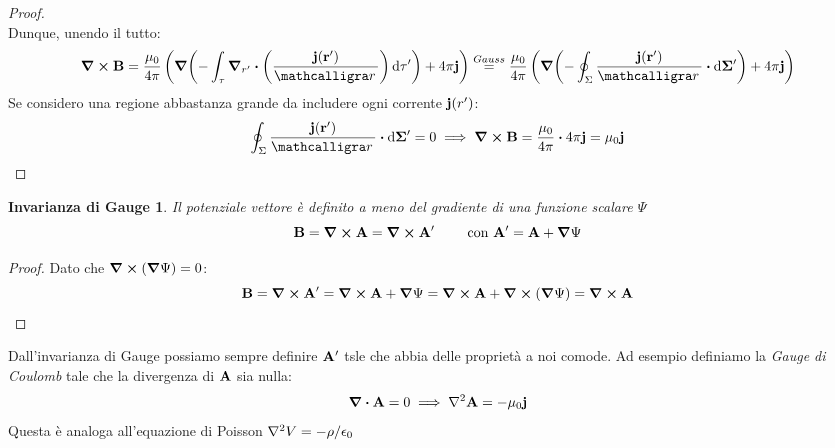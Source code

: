 \documentclass[12pt,a4paper]{article}
\begin{document}
\begin{proof}
\begin{equation*}
    \end{equation*}
    Dunque, unendo il tutto:
    \begin{equation*}
        \curl{\vb{B}}= \frac{\mu_0}{4\pi}\left( \grad(- \int_\tau\grad_{r'}\vdot\left( \frac{\vb{j}(\vb{r}')}{\scriptr} \right)\dd{\tau'}) + 4\pi\vb{j}\right)
        \overset{Gauss}{=} \frac{\mu_0}{4\pi}\left( \grad(-\oint_\Sigma \frac{\vb{j}(\vb{r}')}{\scriptr}\vdot \dd{\vb{\Sigma}'}) +4\pi\vb{j} \right)
    \end{equation*}
    Se considero una regione abbastanza grande da includere ogni corrente $\vb{j}(r')$:
    \begin{equation*}
        \oint_\Sigma \frac{\vb{j}(\vb{r}')}{\scriptr}\vdot \dd{\vb{\Sigma}'}= 0
        \implies \curl{\vb{B}}= \frac{\mu_0}{4\pi} \vdot4\pi\vb{j}= \mu_0\vb{j}
    \end{equation*}
\end{proof}


\newtheorem*{IG}{Invarianza di Gauge}
\begin{IG}
    Il potenziale vettore è definito a meno del gradiente di una funzione scalare $\Psi$
    \begin{equation*}
        \vb{B}= \curl{\vb{A}}= \curl{\vb{A}'} \qquad \text{ con } \vb{A}' = \vb{A}+\grad{\Psi}
    \end{equation*}
\end{IG}
\begin{proof}
    Dato che $\curl(\grad{\Psi})= 0$:
    \begin{equation*}
        \vb{B}= \curl{\vb{A}'}= \curl{\vb{A}+\grad{\Psi}} =  \curl{\vb{A}} + \curl(\grad{\Psi})=  \curl{\vb{A}}
    \end{equation*}
\end{proof}

Dall'invarianza di Gauge possiamo sempre definire $\vb{A}'$ tsle che abbia delle proprietà a noi comode. Ad esempio definiamo
la \textit{Gauge di Coulomb} tale che la divergenza di $\vb{A}$ sia nulla:
\begin{equation*}
    \div{\vb{A}}=0 \implies\laplacian{\vb{A}}= -\mu_0\vb{j}
\end{equation*}
Questa è analoga all'equazione di Poisson $\laplacian{V}= -\rho/\epsilon_0$
\end{document}
